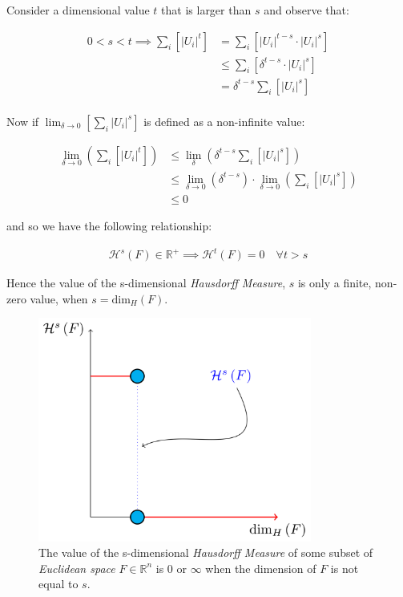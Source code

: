\documentclass[a4paper,11pt,twoside]{article}
\begin{document}
Consider a dimensional value \(t\) that is larger than  \(s\) and observe that:

\begin{align*}
0<s<t  \implies   \sum_{i}  \left[ \left\lvert U_i \right\rvert^t \right] &= \sum_{i}\left[ \left\lvert U_i \right\rvert^{t- s} \cdot  \left\lvert U_i \right\rvert^s \right] \\
&\leq \sum_{i} \left[ \delta^{t - s} \cdot \left\lvert U_i \right\rvert^s  \right]    \\
&= \delta^{t- s}\sum_{i}   \left[ \left\lvert U_i \right\rvert^s \right] 									   \\
\end{align*}

Now if \(\lim_{\delta \rightarrow 0}\left[ \sum_{i}   \left\lvert U_i \right\rvert^s \right]\) is defined as a non-infinite value:

\begin{align}
    \lim_{\delta \rightarrow 0} \left( \sum_{i}   \left[ \left\lvert U_i \right\rvert^t \right]  \right) & \leq \lim_{\delta}\left( \delta^{t- s} \sum_{i}   \left[ \left\lvert U_i \right\rvert^s \right]  \right) \\
&\leq \lim_{\delta \rightarrow 0}\left( \delta^{t - s} \right) \cdot  \lim_{\delta \rightarrow 0}\left( \sum_{i} \left[ \left\lvert U_i \right\rvert^s \right]    \right) \\
&\leq 0
\end{align}

and so we have the following relationship:

\begin{align}
    \mathcal{H}^{s} \left(F\right) \in \mathbb{R}^{+}  \implies  \mathcal{H}^t\left( F \right)= 0 \quad \forall t > s \label{eq:hdfzero}
\end{align}

Hence the value of the s-dimensional \emph{Hausdorff Measure}, \(s\) is only a finite, non-zero value, when \(s = \mathrm{dim}_{H}\left( F \right)\).



\begin{figure}[htbp]
\centering
\includegraphics[width=9cm]{media/tikz/hausdorff-dimension-plot.png}
\caption{\label{hausdorff-vals}The value of the s-dimensional \emph{Hausdorff Measure} of some subset of \emph{Euclidean space} \(F\in \mathbb{R}^{n}\) is 0 or \(\infty\) when the dimension of \(F\) is not equal to \(s\).}
\end{figure}
\end{document}
